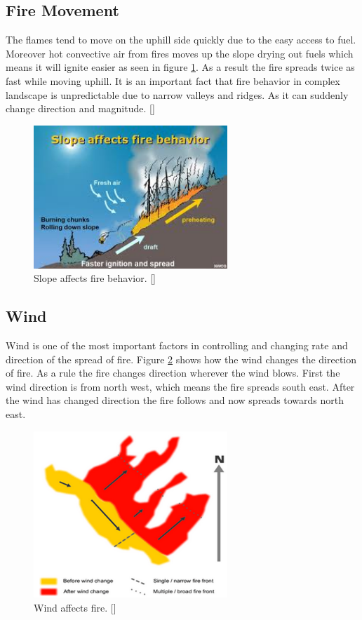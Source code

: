 \subsection{Fire Movement}
The flames tend to move on the uphill side quickly due to the easy access to fuel. Moreover hot convective air from fires moves up the slope drying out fuels which means it will ignite easier as seen in figure \ref{fig:fire-slope}. As a result the fire spreads twice as fast while moving uphill. It is an important fact that fire behavior in complex landscape is unpredictable due to narrow valleys and ridges. As it can suddenly change direction and magnitude. []
\begin{figure}[here]
  \centering
      \includegraphics[width=0.65\textwidth]{theory/graphics/fire-slope.jpg}
  \caption{Slope affects fire behavior. [] }
  \label{fig:fire-slope}
\end{figure}
\subsection{Wind}
Wind is one of the most important factors in controlling and changing rate and direction of the spread of fire. Figure \ref{fig:fire-wind} shows how the wind changes the direction of fire. As a rule the fire changes direction wherever the wind blows. First the wind direction is from north west, which means the fire spreads south east. After the wind has changed direction the fire follows and now spreads towards north east.
\begin{figure}[here]
  \centering
      \includegraphics[width=0.65\textwidth]{theory/graphics/fire-wind.png}
  \caption{Wind affects fire. [] }
  \label{fig:fire-wind}
\end{figure}

